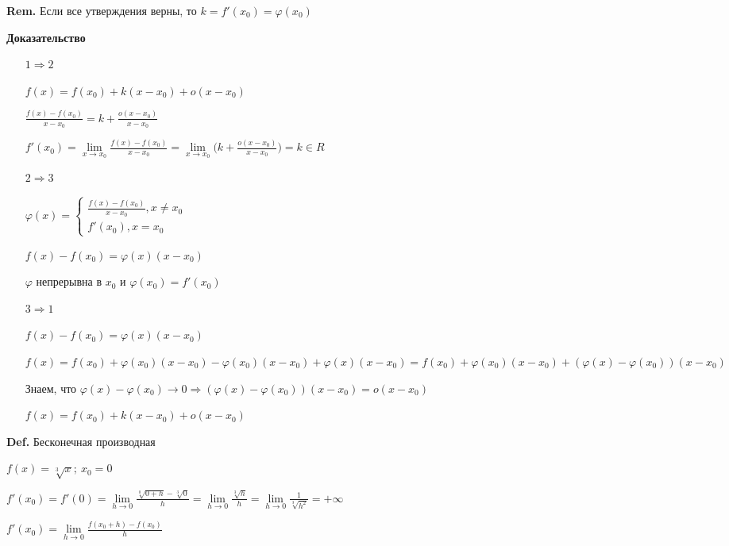 \documentclass[14pt, letter paper]{article}
\begin{document}
\textbf{Rem.} Если все утверждения верны, то $k = f'(x_0) = \varphi(x_0)$

\begin{center}
    \textbf{Доказательство}
\end{center}

\begin{itemize}
    \item[$1 \Rightarrow 2$]

    $f(x) = f(x_0) + k(x - x_0) + o(x - x_0)$

    $\frac{f(x) - f(x_0)}{x-x_0} = k + \frac{o(x-x_0)}{x - x_0}$

    $f'(x_0) = \lim\limits_{x \rightarrow x_0}{\frac{f(x)-f(x_0)}{x-x_0}} = \lim\limits_{x \rightarrow x_0}{(k + \frac{o(x-x_0)}{x-x_0}}) = k \in R$

    \item[$2 \Rightarrow 3$]

    $\varphi(x) = \begin{cases}
        \frac{f(x)-f(x_0)}{x-x_0}, x \neq x_0 \\
        f'(x_0), x = x_0
    \end{cases}$

    $f(x)-f(x_0) = \varphi(x)(x-x_0)$

    $\varphi$ непрерывна в $x_0$ и $\varphi(x_0) = f'(x_0)$

    \item[$3 \Rightarrow 1$]

    $f(x) - f(x_0) = \varphi(x)(x-x_0)$

    $f(x) = f(x_0) + \varphi(x_0)(x-x_0) - \varphi(x_0)(x-x_0) + \varphi(x)(x-x_0) = f(x_0) + \varphi(x_0)(x-x_0) + (\varphi(x) - \varphi(x_0))(x-x_0)$

    Знаем, что $\varphi(x) - \varphi(x_0) \rightarrow 0 \Rightarrow (\varphi(x) - \varphi(x_0))(x-x_0) = o(x-x_0)$

    $f(x) = f(x_0) + k(x-x_0) + o(x-x_0)$
\end{itemize}

\textbf{Def.} Бесконечная производная

$f(x) = \sqrt[3]{x};\ x_0 = 0$

$f'(x_0) = f'(0) = \lim\limits_{h \rightarrow 0} \frac{\sqrt[0]{0 + h} - \sqrt[3]{0}}{h} = \lim\limits_{h \rightarrow 0} \frac{\sqrt[3]{h}}{h} = \lim\limits_{h \rightarrow 0} \frac{1}{\sqrt[3]{h^2}} = + \infty$

$f'(x_0) = \lim\limits_{h \rightarrow 0} \frac{f(x_0 + h) - f(x_0)}{h}$
\end{document}
